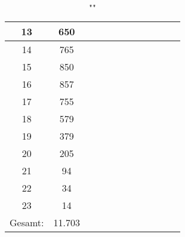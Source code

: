 \begin{table}
\begin{tabular}{||c|c|c|c|c|c|c|c|c|c|c|c||}
        13      & 650    &     &     &     &     &     &     &     &     &     &     \\\hline
        14      & 765    &     &     &     &     &     &     &     &     &     &     \\\hline
        15      & 850    &     &     &     &     &     &     &     &     &     &     \\\hline
        16      & 857    &     &     &     &     &     &     &     &     &     &     \\\hline
        17      & 755    &     &     &     &     &     &     &     &     &     &     \\\hline
        18      & 579    &     &     &     &     &     &     &     &     &     &     \\\hline
        19      & 379    &     &     &     &     &     &     &     &     &     &     \\\hline
        20      & 205    &     &     &     &     &     &     &     &     &     &     \\\hline
        21      & 94     &     &     &     &     &     &     &     &     &     &     \\\hline
        22      & 34     &     &     &     &     &     &     &     &     &     &     \\\hline
        23      & 14     &     &     &     &     &     &     &     &     &     &     \\\hline\hline
        Gesamt: & 11.703 &     &     &     &     &     &     &     &     &     &
    \end{tabular}
    \caption{""}
    \label{tab:experiment-1-table}
    \centering
\end{table}

